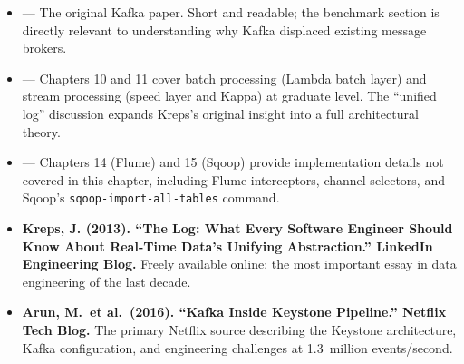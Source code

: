 \begin{itemize}
  \item \textbf{\cite{Kafka2011}} --- The original Kafka paper. Short and
        readable; the benchmark section is directly relevant to
        understanding why Kafka displaced existing message brokers.
  \item \textbf{\cite{Kleppmann2017}} --- Chapters 10 and 11 cover batch
        processing (Lambda batch layer) and stream processing (speed layer
        and Kappa) at graduate level. The ``unified log'' discussion
        expands Kreps's original insight into a full architectural theory.
  \item \textbf{\cite{White2015}} --- Chapters 14 (Flume) and 15 (Sqoop)
        provide implementation details not covered in this chapter, including
        Flume interceptors, channel selectors, and Sqoop's \texttt{sqoop-import-all-tables}
        command.
  \item \textbf{Kreps, J. (2013). ``The Log: What Every Software Engineer
        Should Know About Real-Time Data's Unifying Abstraction.''
        LinkedIn Engineering Blog.} Freely available online; the most
        important essay in data engineering of the last decade.
  \item \textbf{Arun, M.\ et al.\ (2016). ``Kafka Inside Keystone Pipeline.''
        Netflix Tech Blog.} The primary Netflix source describing the
        Keystone architecture, Kafka configuration, and engineering
        challenges at 1.3~million events/second.
\end{itemize}
